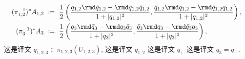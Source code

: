 \documentclass[
    affil-it, %
    auth-lg, %
    british, %
    compression, %
    contents, %
    custom-packages={}, %
    references={bigone}, %
]{lib/preprint}
\begin{document}
\begin{body}
\begin{subequations}
\begin{equation}
                \begin{aligned}
                    (\pi_{1,2}^{-1})^*A_{1,2}\ &\coloneqq\ \frac12\left(\frac{q_{1,2}\rmd\bar q_{1,2}-\rmd q_{1,2}\bar q_{1,2}}{1+|q_{1,2}|^2},\frac{\bar q_{1,2}\rmd q_{1,2}-\rmd\bar q_{1,2} q_{1,2}}{1+|q_{1,2}|^2}\right),
                    \\
                    (\pi_3^{-1})^*A_3\ &\coloneqq\ \frac12\left(\frac{q_3\rmd\bar q_3-\rmd q_3\bar q_3}{1+|q_3|^2},\frac{\bar q_3\rmd q_3-\rmd\bar q_3 q_3}{1+|q_3|^2}\right),
                \end{aligned}
            \end{equation}
        \end{subequations}  这是译文 $q_{1,2,3}\in\pi_{1,2,3}(U_{1,2,3})$, 这是译文 $q_{1,2}$ 这是译文 $q_+$ 这是译文 $q_3=q_-$.
        

\end{body}
\end{document}
